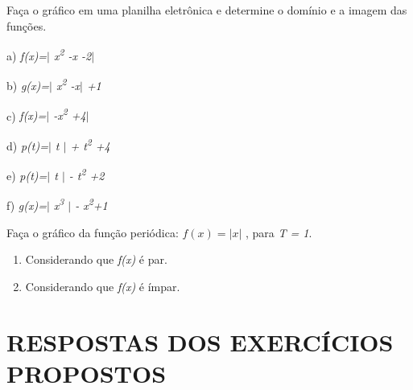 \begin{exercicios}
	\exitem{} Faça o gráfico em uma planilha eletrônica e determine o domínio e a imagem das funções.

\begin{multicols}{3}

	a) \textit{f(x)=$ \vert $ x\textsuperscript{2 }-x -2$ \vert $}

	b) \textit{g(x)=$ \vert $  x\textsuperscript{2 }-x$ \vert $ +1}
	
	c) \textit{f(x)=$ \vert $ -x\textsuperscript{2 }+4$ \vert $}

	d) \textit{p(t)=$ \vert $ t $ \vert $ + t\textsuperscript{2 }+4}
	
	e) \textit{p(t)=$ \vert $ t $ \vert $ - t\textsuperscript{2 }+2\quad }

	f) \textit{g(x)=$ \vert $  x\textsuperscript{3 }$ \vert $ - x\textsuperscript{2}+1}
\end{multicols}

	\exitem{} Faça o gráfico da função periódica:   \( f \left( x \right) = \vert x \vert   \) , para \textit{T = 1}.

\begin{enumerate}
	\item Considerando que \textit{f(x)} é par.

	\item Considerando que \textit{f(x)} é ímpar.
\end{enumerate}
\end{exercicios}

\newpage
\section{RESPOSTAS DOS EXERCÍCIOS PROPOSTOS}

